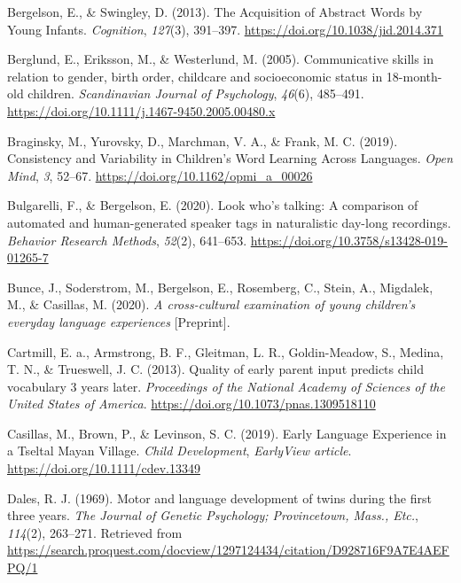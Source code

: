 \documentclass[
  man,mask,floatsintext]{apa6}
\newlength{\cslhangindent}
\newlength{\cslentryspacingunit} %
\newenvironment{CSLReferences}[2] %
 {%
  \setlength{\parindent}{0pt}
  \ifodd #1
  \let\oldpar\par
  \def\par{\hangindent=\cslhangindent\oldpar}
  \fi
  \setlength{\parskip}{#2\cslentryspacingunit}
 }%
 {}
\begin{document}
\begin{CSLReferences}{1}{0}
\leavevmode{}%
Bergelson, E., \& Swingley, D. (2013). The {Acquisition} of {Abstract} {Words} by {Young} {Infants}. \emph{Cognition}, \emph{127}(3), 391--397. \url{https://doi.org/10.1038/jid.2014.371}

\leavevmode{}%
Berglund, E., Eriksson, M., \& Westerlund, M. (2005). Communicative skills in relation to gender, birth order, childcare and socioeconomic status in 18-month-old children. \emph{Scandinavian Journal of Psychology}, \emph{46}(6), 485--491. \url{https://doi.org/10.1111/j.1467-9450.2005.00480.x}

\leavevmode{}%
Braginsky, M., Yurovsky, D., Marchman, V. A., \& Frank, M. C. (2019). Consistency and {Variability} in {Children}'s {Word} {Learning} {Across} {Languages}. \emph{Open Mind}, \emph{3}, 52--67. \url{https://doi.org/10.1162/opmi_a_00026}

\leavevmode{}%
Bulgarelli, F., \& Bergelson, E. (2020). Look who's talking: {A} comparison of automated and human-generated speaker tags in naturalistic day-long recordings. \emph{Behavior Research Methods}, \emph{52}(2), 641--653. \url{https://doi.org/10.3758/s13428-019-01265-7}

\leavevmode{}%
Bunce, J., Soderstrom, M., Bergelson, E., Rosemberg, C., Stein, A., Migdalek, M., \& Casillas, M. (2020). \emph{A cross-cultural examination of young children's everyday language experiences} {[}Preprint{]}.

\leavevmode{}%
Cartmill, E. a., Armstrong, B. F., Gleitman, L. R., Goldin-Meadow, S., Medina, T. N., \& Trueswell, J. C. (2013). Quality of early parent input predicts child vocabulary 3 years later. \emph{Proceedings of the National Academy of Sciences of the United States of America}. \url{https://doi.org/10.1073/pnas.1309518110}

\leavevmode{}%
Casillas, M., Brown, P., \& Levinson, S. C. (2019). Early {Language} {Experience} in a {Tseltal} {Mayan} {Village}. \emph{Child Development}, \emph{EarlyView article}. \url{https://doi.org/10.1111/cdev.13349}

\leavevmode{}%
Dales, R. J. (1969). Motor and language development of twins during the first three years. \emph{The Journal of Genetic Psychology; Provincetown, Mass., Etc.}, \emph{114}(2), 263--271. Retrieved from \url{https://search.proquest.com/docview/1297124434/citation/D928716F9A7E4AEFPQ/1}


\end{CSLReferences}
\end{document}

